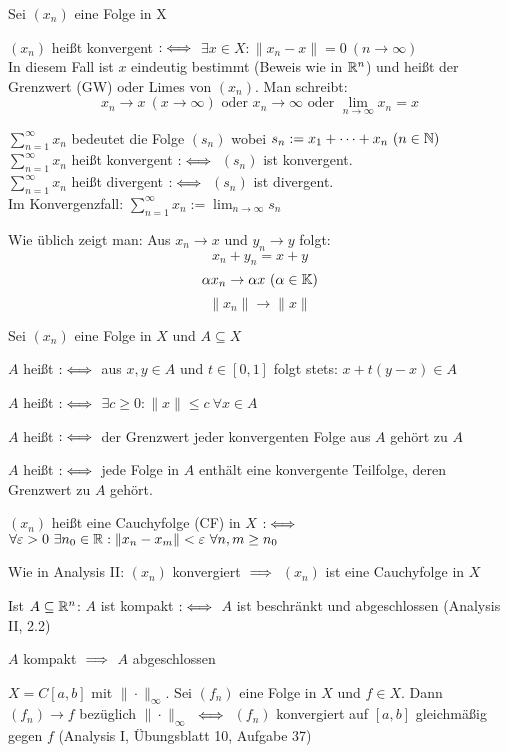 \documentclass{article}
\begin{document}
\begin{definition}
Sei $(x_n)$ eine Folge in X
\begin{liste}
\item $(x_n)$ heißt konvergent $:\iff$ $\exists x\in X: \|x_n - x\| = 0\ (n\to\infty)$\\
In diesem Fall ist $x$ eindeutig bestimmt (Beweis wie in $\mathbb{R}^n$) und heißt der Grenzwert (GW) oder Limes von $(x_n)$. Man schreibt:
\[ x_n \to x \ (x\to\infty) \text{ oder } x_n \to \infty \text{ oder } \lim_{n\to\infty}x_n = x \]
\item $\sum_{n=1}^\infty x_n$ bedeutet die Folge $(s_n)$ wobei $s_n := x_1+\cdots+x_n \ (n\in\MdN)$\\
 $\sum_{n=1}^\infty x_n$  heißt konvergent $:\iff$ $(s_n)$ ist konvergent.\\
 $\sum_{n=1}^\infty x_n$  heißt divergent $:\iff$ $(s_n)$ ist divergent.\\
 Im Konvergenzfall: $\sum_{n=1}^\infty x_n := \lim_{n\to\infty} s_n$
\end{liste}
\end{definition}
Wie üblich zeigt man: Aus $x_n\to x$ und $y_n\to y$ folgt:
\[x_n+y_n = x + y\]
\[\alpha x_n \to \alpha x \ (\alpha \in \mathbb{K})\]
\[\|x_n\|\to \|x\|\]


\begin{definition}
Sei $(x_n)$ eine Folge in $X$ und $A\subseteq X$
\begin{liste}
\item $A$ heißt  $:\iff$ aus $x,y\in A$ und $t\in[0,1]$ folgt stets: $x+t(y-x) \in A$
\item $A$ heißt  $:\iff$ $\exists c\ge0: \|x\|\le c \ \forall x\in A$
\item $A$ heißt  $:\iff$ der Grenzwert jeder konvergenten Folge aus $A$ gehört zu $A$
\item $A$ heißt  $:\iff$ jede Folge in $A$ enthält eine konvergente Teilfolge, deren Grenzwert zu $A$ gehört.
\item $(x_n)$ heißt eine Cauchyfolge (CF) in $X$ $:\iff$\\ $\forall \varepsilon>0 \ \exists n_0\in\mathbb{R}: \|x_n-x_m\|<\varepsilon \ \forall n,m\ge n_0$
\end{liste}
\end{definition}

\begin{bemerkung}
\begin{liste}
\item Wie in Analysis II: $(x_n)$ konvergiert $\implies$ $(x_n)$ ist eine Cauchyfolge in $X$
\item Ist $A\subseteq \mathbb{R}^n$: $A$ ist kompakt $:\iff$ $A$ ist beschränkt und abgeschlossen (Analysis II, 2.2)
\item $A$ kompakt $\implies$ $A$ abgeschlossen
\item $X=C[a,b]$ mit $\|\cdot\|_\infty$. Sei $(f_n)$ eine Folge in $X$ und $f\in X$. Dann $(f_n) \to f$ bezüglich $\|\cdot\|_\infty$ $\iff$ $(f_n)$ konvergiert auf $[a,b]$ gleichmäßig gegen $f$ (Analysis  I, Übungsblatt 10, Aufgabe 37)
\end{liste}
\end{bemerkung}
\end{document}
